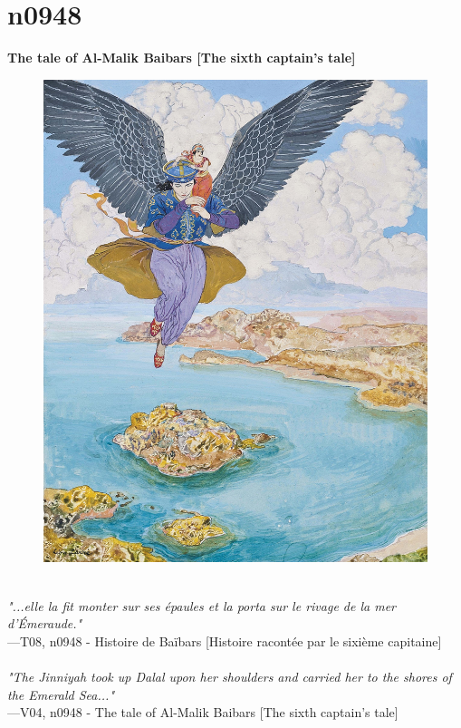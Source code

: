 \documentclass[../Carre_nights.tex]{subfiles}
\begin{document}
\newpage

\section{n0948}
\textbf{\Large{The tale of Al-Malik Baibars [The sixth captain’s tale]}} \\

\begin{figure}[ht]
\centering
\includegraphics[height=\figsize]{illustrations/volume_8/T08, n0948 - Histoire de Baïbars [Histoire racontée par le sixième capitaine].jpg}
\end{figure}

\textit{\\
"...elle la fit monter sur ses épaules et la porta sur le rivage de la mer d’Émeraude."} \\
—T08, n0948 - Histoire de Baïbars [Histoire racontée par le sixième capitaine] \\~\\
\textit{"The Jinniyah took up Dalal upon her shoulders and carried her to the shores of the Emerald Sea..."} \\
—V04, n0948 - The tale of Al-Malik Baibars [The sixth captain’s tale]
\end{document}

